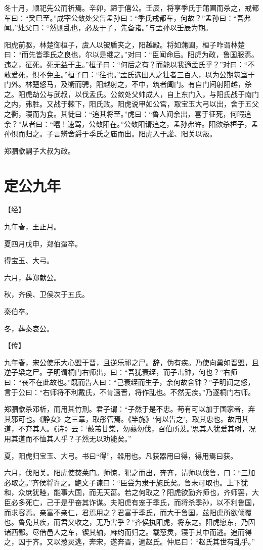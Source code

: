 \documentclass[a4paper,12pt,UTF8,twoside]{ctexbook}
\begin{document}
冬十月，顺祀先公而祈焉。辛卯，禘于僖公。壬辰，将享季氏于蒲圃而杀之，戒都车曰：“癸巳至。”成宰公敛处父告孟孙曰：“季氏戒都车，何故？”孟孙曰：“吾弗闻。”处父曰：“然则乱也，必及于子，先备诸。”与孟孙以壬辰为期。

阳虎前驱，林楚御桓子，虞人以铍盾夹之，阳越殿。将如蒲圃，桓子咋谓林楚曰：“而先皆季氏之良也，尔以是继之。”对曰：“臣闻命后。阳虎为政，鲁国服焉。违之，征死。死无益于主。”桓子曰：“何后之有？而能以我適孟氏乎？”对曰：“不敢爱死，惧不免主。”桓子曰：“往也。”孟氏选圉人之壮者三百人，以为公期筑室于门外。林楚怒马，及衢而骋，阳越射之，不中，筑者阖门。有自门间射阳越，杀之。阳虎劫公与武叔，以伐孟氏。公敛处父帅成人，自上东门入，与阳氏战于南门之内，弗胜。又战于棘下，阳氏败。阳虎说甲如公宫，取宝玉大弓以出，舍于五父之衢，寝而为食。其徒曰：“追其将至。”虎曰：“鲁人闻余出，喜于征死，何暇追余？”从者曰：“嘻！速驾，公敛阳在。”公敛阳请追之，孟孙弗许。阳欲杀桓子，孟孙惧而归之。子言辨舍爵于季氏之庙而出。阳虎入于讙、阳关以叛。

郑驷歂嗣子大叔为政。


\section{定公九年}


【经】

九年春，王正月。

夏四月戊申，郑伯虿卒。

得宝玉、大弓。

六月，葬郑献公。

秋，齐侯、卫侯次于五氏。

秦伯卒。

冬，葬秦哀公。

【传】

九年春，宋公使乐大心盟于晋，且逆乐祁之尸。辞，伪有疾。乃使向巢如晋盟，且逆子梁之尸。子明谓桐门右师出，曰：“吾犹衰绖，而子击钟，何也？”右师曰：“丧不在此故也。”既而告人曰：“己衰绖而生子，余何故舍钟？”子明闻之怒，言于公曰：“右师将不利戴氏，不肯適晋，将作乱也。不然无疾。”乃逐桐门右师。

郑驷歂杀邓析，而用其竹刑。君子谓：“子然于是不忠。苟有可以加于国家者，弃其邪可也。《静女》之三章，取彤管焉。《竿旄》‘何以告之’，取其忠也。故用其道，不弃其人。《诗》云：‘蔽芾甘棠，勿翦勿伐，召伯所茇。’思其人犹爱其树，况用其道而不恤其人乎？子然无以劝能矣。”

夏，阳虎归宝玉、大弓。书曰“得”，器用也。凡获器用曰得，得用焉曰获。

六月，伐阳关。阳虎使焚莱门。师惊，犯之而出，奔齐，请师以伐鲁，曰：“三加必取之。”齐侯将许之。鲍文子谏曰：“臣尝为隶于施氏矣。鲁未可取也。上下犹和，众庶犹睦，能事大国，而无天菑。若之何取之？阳虎欲勤齐师也，齐师罢，大臣必多死亡，己于是乎奋其诈谋。夫阳虎有宠于季氏，而将杀季孙，以不利鲁国，而求容焉。亲富不亲仁，君焉用之？君富于季氏，而大于鲁国，兹阳虎所欲倾覆也。鲁免其疾，而君又收之，无乃害乎？”齐侯执阳虎，将东之。阳虎愿东，乃囚诸西鄙。尽借邑人之车，锲其轴，麻约而归之。载葱灵，寝于其中而逃。追而得之，囚于齐。又以葱灵逃，奔宋，遂奔晋，適赵氏。仲尼曰：“赵氏其世有乱乎。”
\end{document}
